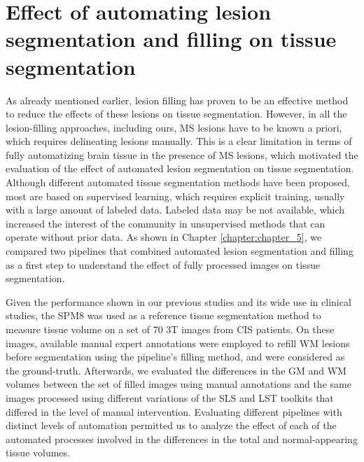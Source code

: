 \section{Effect of automating lesion segmentation and filling on  tissue segmentation}
\label{sec:label}

As already mentioned earlier, lesion filling has proven to be an effective method to reduce the effects of these lesions on tissue segmentation. However, in all the lesion-filling approaches, including ours, MS lesions have to be known a priori, which requires delineating lesions manually. This is a clear limitation in terms of fully automatizing brain tissue in the presence of MS lesions, which motivated the evaluation of the effect of automated lesion segmentation on tissue segmentation. Although different automated tissue segmentation methods have been proposed, most are based on supervised learning, which requires explicit training, usually with a large amount of labeled data. Labeled data may be not available, which increased the interest of the community in unsupervised methods that can operate without prior data. As shown in Chapter \ref{chapter:chapter_5}, we compared two pipelines that combined automated lesion segmentation and filling as a first step to understand the effect of fully processed images on tissue segmentation. 
 
Given the performance shown in our previous studies and its wide use in clinical studies, the SPM8 was used as a reference tissue segmentation method to measure tissue volume on a set of 70 3T images from CIS patients. On these images, available manual expert annotations were employed to refill WM lesions before segmentation using the pipeline's filling method, and were considered as the ground-truth. Afterwards, we evaluated the differences in the GM and WM volumes between the set of filled images using manual annotations and the same images processed using different variations of the SLS and LST toolkits that differed in the level of manual intervention. Evaluating different pipelines with distinct levels of automation  permitted us to analyze the effect of each of the automated processes involved in the differences in the total and normal-appearing tissue volumes.  

